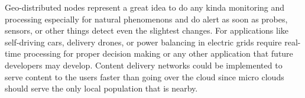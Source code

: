 Geo-distributed nodes represent a great idea to do any kinda monitoring and processing especially for natural phenomenons and do alert as soon as probes, sensors, or other things detect even the slightest changes. For applications like self-driving cars, delivery drones, or power balancing in electric grids require real-time processing for proper decision making or any other application that future developers may develop. Content delivery networks could be implemented to serve content to the users faster than going over the cloud since micro clouds should serve the only local population that is nearby.
%
%